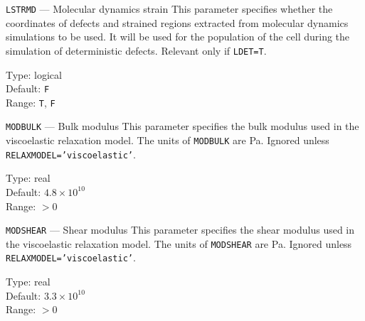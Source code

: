 \ifprivate
\begin{keydescription}{\texttt{LSTRMD} --- Molecular dynamics strain}
%
  This parameter specifies whether the coordinates of defects and strained
  regions extracted from molecular dynamics simulations to be used.  It will
  be used for the population of the cell during the simulation of deterministic
  defects. Relevant only if \texttt{LDET=T}.

  \begin{keytab} 
    Type: \> logical \\ 
    Default: \> \texttt{F} \\ 
    Range: \>  \texttt{T}, \texttt{F}
  \end{keytab}
\end{keydescription}
\fi

\iffalse                       %
\begin{keydescription}{\texttt{LVAC} --- Vacancy flag}
%
  This parameter specifies whether vacancy distributions have to be
  recorded.  If \texttt{LVAC=F} no vacancy distributions are provided,
  and the vacancy distribution is assumed to be identical to the
  interstitial distribution for internal damage consideration.
  \begin{keytab}
    Type:    \> logical \\
    Default: \> \texttt{F} \\
    Range:   \> \texttt{T}, \texttt{F}
  \end{keytab}
\end{keydescription}
\fi

\ifprivate
\begin{keydescription}{\texttt{MODBULK} --- Bulk modulus}
%
  This parameter specifies the bulk modulus used in the 
  viscoelastic relaxation model. The units of \texttt{MODBULK} are Pa.
  Ignored unless \texttt{RELAXMODEL='viscoelastic'}.
  \begin{keytab}
    Type:    \> real \\
    Default: \> $4.8 \times 10^{10}$ \\
    Range:   \> $>0$
  \end{keytab}
\end{keydescription}

\begin{keydescription}{\texttt{MODSHEAR} --- Shear modulus}
%
  This parameter specifies the shear modulus used in the 
  viscoelastic relaxation model. The units of \texttt{MODSHEAR} are Pa.
  Ignored unless \texttt{RELAXMODEL='viscoelastic'}.
  \begin{keytab}
    Type:    \> real \\
    Default: \> $3.3 \times 10^{10}$ \\
    Range:   \> $>0$
  \end{keytab}
\end{keydescription}
\fi

